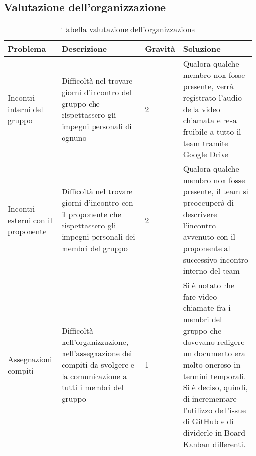 \subsection{Valutazione dell'organizzazione}

{

\centering
\renewcommand{\arraystretch}{2}
\begin{longtable}{C{2cm} C{5cm} C{2cm} C{5.2cm}}
\caption{Tabella valutazione dell'organizzazione}\\
\textbf{Problema} &
\textbf{Descrizione}&
\textbf{Gravità}&
\textbf{Soluzione}\\
\endhead


Incontri interni del gruppo & Difficoltà nel trovare giorni d'incontro del gruppo che rispettassero gli impegni personali di ognuno & 2 & Qualora qualche membro non fosse presente, verrà registrato l'audio della video chiamata e resa fruibile a tutto il team tramite Google Drive\\
Incontri esterni con il proponente & Difficoltà nel trovare giorni d'incontro con il proponente che rispettassero gli impegni personali dei membri del gruppo & 2 & Qualora qualche membro non fosse presente, il team si preoccuperà di descrivere l'incontro avvenuto con il proponente al successivo incontro interno del team\\
Assegnazioni compiti & Difficoltà nell'organizzazione, nell'assegnazione dei compiti da svolgere e la comunicazione a tutti i membri del gruppo & 1 & Si è notato che fare video chiamate fra i membri del gruppo che dovevano redigere un documento era molto oneroso in termini temporali. Si è deciso, quindi,  di incrementare l'utilizzo dell'issue di GitHub e di dividerle in Board Kanban differenti.\\


\end{longtable}
}
